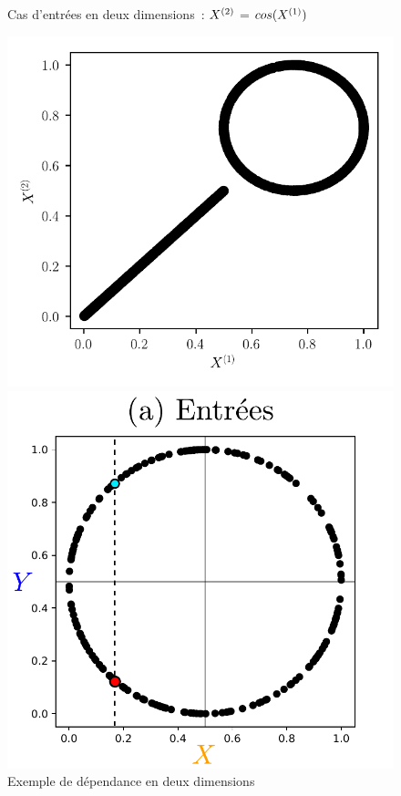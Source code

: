 \documentclass[../main]{subfiles}
\begin{document}
\begin{figure}
\begin{minipage}{\textwidth}
\begin{minipage}{0.33\textwidth}
			\caption{Cas d'entrées en deux dimensions~: $X^{({2})}$ = $cos(X^{({1})})$ \label{fig:cos}}
		\end{minipage}
		\begin{minipage}{0.33\textwidth}
			\includegraphics[width=\textwidth]{2som_mix_in.pdf}
			\caption{Exemple de dépendance en deux dimensions  \label{fig:mix}}
		\end{minipage}
	\end{minipage}
	\begin{minipage}{\textwidth}
		\begin{minipage}{0.33\textwidth}
			\includegraphics[width=\textwidth]{2som_inp_noU.pdf}

\end{minipage}
\end{minipage}
\end{figure}
\end{document}
